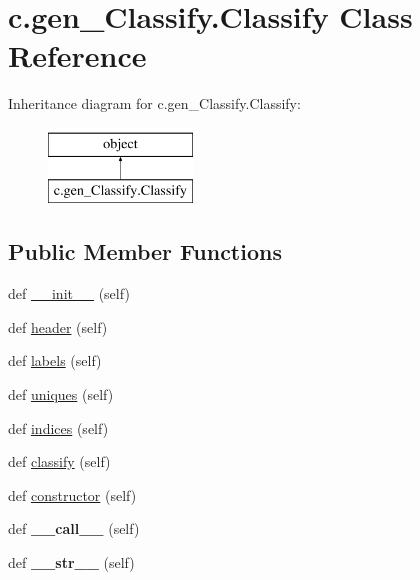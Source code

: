 \hypertarget{classc_1_1gen___classify_1_1_classify}{}\section{c.\+gen\+\_\+\+Classify.\+Classify Class Reference}
\label{classc_1_1gen___classify_1_1_classify}
Inheritance diagram for c.\+gen\+\_\+\+Classify.\+Classify\+:\begin{figure}[H]
\begin{center}
\leavevmode
\includegraphics[height=2.000000cm]{classc_1_1gen___classify_1_1_classify}
\end{center}
\end{figure}
\subsection*{Public Member Functions}
\begin{DoxyCompactItemize}
\item 
def \hyperlink{classc_1_1gen___classify_1_1_classify_aed6e38afde933264e3071c5994137cf0}{\+\_\+\+\_\+init\+\_\+\+\_\+} (self)
\item 
def \hyperlink{classc_1_1gen___classify_1_1_classify_a5572dfebb121bca3d9579178c18a88f6}{header} (self)
\item 
def \hyperlink{classc_1_1gen___classify_1_1_classify_a69fa1e0c052f5b4cabbedd0b8b307465}{labels} (self)
\item 
def \hyperlink{classc_1_1gen___classify_1_1_classify_a13efe5835d6ef4e04375b2cd2fd8e2a7}{uniques} (self)
\item 
def \hyperlink{classc_1_1gen___classify_1_1_classify_a73e5745a3dabe958db276f9fb144b707}{indices} (self)
\item 
def \hyperlink{classc_1_1gen___classify_1_1_classify_af31ba173bccfbdbf393e3749c191bffc}{classify} (self)
\item 
def \hyperlink{classc_1_1gen___classify_1_1_classify_a8bb78c08e532bffc601d834d7ae4d4b6}{constructor} (self)
\item 
\hypertarget{classc_1_1gen___classify_1_1_classify_a89991f419d151eaa305151b14c340301}{}def {\bfseries \+\_\+\+\_\+call\+\_\+\+\_\+} (self)\label{classc_1_1gen___classify_1_1_classify_a89991f419d151eaa305151b14c340301}

\item 
\hypertarget{classc_1_1gen___classify_1_1_classify_af3e285a7bc79177cae2cbd7d7aad0434}{}def {\bfseries \+\_\+\+\_\+str\+\_\+\+\_\+} (self)\label{classc_1_1gen___classify_1_1_classify_af3e285a7bc79177cae2cbd7d7aad0434}

\end{DoxyCompactItemize}

